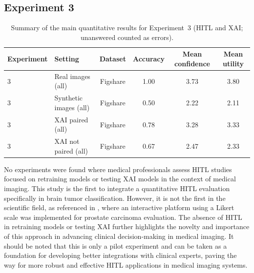 \subsection{Experiment 3}

\begin{table}[H]
\centering
\small
\caption{Summary of the main quantitative results for Experiment~3 (HITL and XAI; unanswered counted as errors).}
\label{tab:global_summary_exp3}
\begin{tabular}{llcccc}
\toprule
Experiment & Setting & Dataset & Accuracy & Mean confidence & Mean utility \\
\midrule
3 & Real images (all)      & Figshare & 1.00 & 3.73 & 3.80 \\
3 & Synthetic images (all) & Figshare & 0.50 & 2.22 & 2.11 \\ \hline
3 & XAI paired (all)       & Figshare & 0.78 & 3.28 & 3.33 \\
3 & XAI not paired (all)   & Figshare & 0.67 & 2.47 & 2.33 \\
\bottomrule
\end{tabular}
\end{table}

No experiments were found where medical professionals assess HITL studies focused on retraining models or testing XAI models in the context of medical imaging. This study is the first to integrate a quantitative HITL evaluation specifically in brain tumor classification. However, it is not the first in the scientific field, as referenced in \cite{manz2025do}, where an interactive platform using a Likert scale was implemented for prostate carcinoma evaluation. The absence of HITL in retraining models or testing XAI further highlights the novelty and importance of this approach in advancing clinical decision-making in medical imaging. It should be noted that this is only a pilot experiment and can be taken as a foundation for developing better integrations with clinical experts, paving the way for more robust and effective HITL applications in medical imaging systems.





